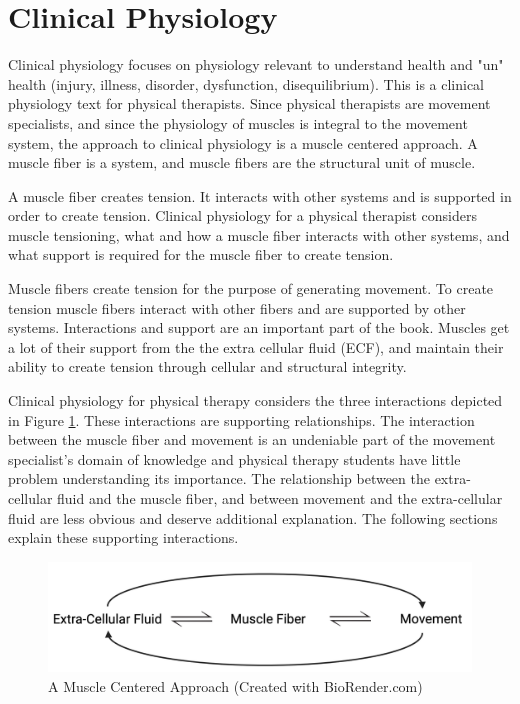 \section{Clinical Physiology}

Clinical physiology focuses on physiology relevant to understand health and "un" health (injury, illness, disorder, dysfunction, disequilibrium). This is a clinical physiology text for physical therapists. Since physical therapists are movement specialists, and since the physiology of muscles is integral to the movement system, the approach to clinical physiology is a muscle centered approach.  A muscle fiber\footnotemark{} is a system, and muscle fibers are the structural unit of muscle. 

A muscle fiber creates tension. It interacts with other systems and is supported in order to create tension. Clinical physiology for a physical therapist considers muscle tensioning, what and how a muscle fiber interacts with other systems, and what support is required for the muscle fiber to create tension.

Muscle fibers create tension for the purpose of generating movement. To create tension muscle fibers interact  with other fibers and are supported by other systems. Interactions and support are an important part of the book. Muscles get a lot of their support from the the extra cellular fluid (ECF), and maintain their ability to create tension through cellular and structural integrity.

Clinical physiology for physical therapy considers the three interactions depicted in Figure \ref{fig:muscle_centered_approach}. These interactions are supporting relationships. The interaction between the muscle fiber and movement is an undeniable part of the movement specialist’s domain of knowledge and physical therapy students have little problem understanding its importance. The relationship between the extra-cellular fluid and the muscle fiber, and between movement and the extra-cellular fluid are less obvious and deserve additional explanation. The following sections explain these supporting interactions.

\begin{figure}[!ht]
    \centering
    \includegraphics[width=1\linewidth]{./figure/muscle_centered_approach.png}
    \caption{A Muscle Centered Approach \footnotesize{(Created with BioRender.com)}}
    \label{fig:muscle_centered_approach}
\end{figure}

